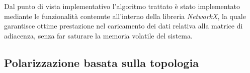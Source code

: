 Dal punto di vista implementativo l'algoritmo trattato è stato implementato mediante le funzionalità contenute all'interno della libreria \textit{NetworkX}, la quale garantisce ottime prestazione nel caricamento dei dati relativa alla matrice di adiacenza, senza far saturare la memoria volatile del sistema.
\newpage
\subsection{Polarizzazione basata sulla topologia}
